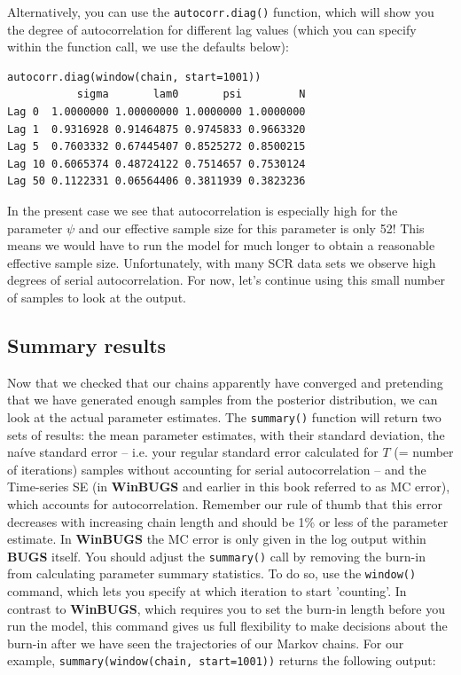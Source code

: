 Alternatively, you can use the \verb#autocorr.diag()# function, which will show you the degree of autocorrelation for different lag values (which you can specify within the function call, we use the defaults below):
\begin{verbatim}
autocorr.diag(window(chain, start=1001))
           sigma       lam0       psi         N
Lag 0  1.0000000 1.00000000 1.0000000 1.0000000
Lag 1  0.9316928 0.91464875 0.9745833 0.9663320
Lag 5  0.7603332 0.67445407 0.8525272 0.8500215
Lag 10 0.6065374 0.48724122 0.7514657 0.7530124
Lag 50 0.1122331 0.06564406 0.3811939 0.3823236
\end{verbatim}
In the present case we see that autocorrelation is especially high for the
parameter $\psi$ and our effective sample size for this parameter is
only 52!
This means we would have to run the model for much longer to
obtain a reasonable effective sample size. Unfortunately, with many SCR data sets we observe high degrees of serial autocorrelation. For now, let's continue using this small number of samples to look at the output.


\subsection{Summary results}
\label{mcmc.sec.mcmcsummary}

Now that we checked that our chains apparently have converged and pretending
that we have generated enough samples from the posterior distribution, we
can look at the actual parameter estimates. The \verb#summary()# function
will return two sets of results: the mean parameter estimates, with their standard deviation, the na\'{i}ve standard error -- i.e. your regular standard error calculated for $T$ (= number of iterations)
samples without
accounting for serial autocorrelation -- and the
Time-series SE (in {\bf WinBUGS}
and earlier in this book referred to as MC error), which accounts for
autocorrelation. Remember our rule of thumb that this error
decreases with increasing chain length and should be 1\% or less of the
parameter estimate. In {\bf WinBUGS} the MC error is only given in the log
output within {\bf BUGS} itself.
You should adjust the \verb#summary()# call by removing the burn-in from
calculating parameter summary statistics. To do so, use the \verb#window()#
command, which lets you specify at which iteration to start
'counting'. In contrast to {\bf WinBUGS}, which requires you to set the
burn-in length before you run the model, this command gives us full
flexibility to make decisions about the burn-in after we have seen the
trajectories of our Markov chains. For our example,
\verb#summary(window(chain, start=1001))# returns the following output:

